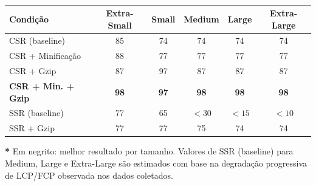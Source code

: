 \begin{table}[htbp]
\centering
\footnotesize
\caption{}
\begin{tabular}{|l|c|c|c|c|c|}
\hline
\textbf{Condição} & \textbf{Extra-Small} & \textbf{Small} & \textbf{Medium} & \textbf{Large} & \textbf{Extra-Large} \\
\hline
CSR (baseline)              & 85  & 74 & 74 & 74 & 74 \\
CSR + Minificação           & 88  & 77 & 77 & 77 & 77 \\
CSR + Gzip                  & 87  & 97 & 87 & 87 & 87 \\
\textbf{CSR + Min. + Gzip}  & \textbf{98} & \textbf{97} & \textbf{98} & \textbf{98} & \textbf{98} \\
SSR (baseline)              & 77  & 65 & $<30$ & $<15$ & $<10$ \\
SSR + Gzip                  & 77  & 77 & 75 & 74 & 74 \\
\hline
\end{tabular}
\vspace{2pt}
\begin{flushleft}
\footnotesize
\textbf{*} Em negrito: melhor resultado por tamanho.
Valores de SSR (baseline) para Medium, Large e Extra-Large são estimados com base na degradação progressiva de LCP/FCP observada nos dados coletados.
\end{flushleft}
\label{tab:lighthouse-score}
\end{table}
